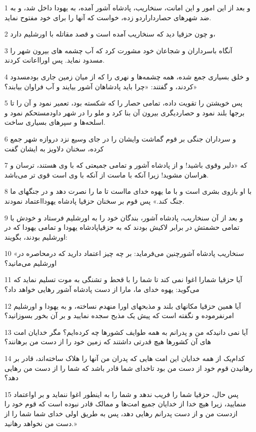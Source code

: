 \par 1 و بعد از این امور و این امانت، سنخاریب، پادشاه آشور آمده، به یهودا داخل شد، و به ضد شهرهای حصارداراردو زده، خواست که آنها را برای خود مفتوح نماید.
\par 2 و چون حزقیا دید که سنخاریب آمده است و قصد مقاتله با اورشلیم دارد،
\par 3 آنگاه باسرداران و شجاعان خود مشورت کرد که آب چشمه های بیرون شهر را مسدود نماید. پس اورااعانت کردند.
\par 4 و خلق بسیاری جمع شده، همه چشمه‌ها و نهری را که از میان زمین جاری بودمسدود کردند، و گفتند: «چرا باید پادشاهان آشور بیایند و آب فراوان بیابند؟»
\par 5 پس خویشتن را تقویت داده، تمامی حصار را که شکسته بود، تعمیر نمود و آن را تا برجها بلند نمود و حصاردیگری بیرون آن بنا کرد و ملو را در شهر داودمستحکم نمود و اسلحه‌ها و سپرهای بسیاری ساخت.
\par 6 و سرداران جنگی بر قوم گماشت وایشان را در جای وسیع نزد دروازه شهر جمع کرده، سخنان دلاویز به ایشان گفت
\par 7 که «دلیر وقوی باشید! و از پادشاه آشور و تمامی جمیعتی که با وی هستند، ترسان و هراسان مشوید! زیرا آنکه با ماست از آنکه با وی است قوی تر می‌باشد.
\par 8 با او بازوی بشری است و با ما یهوه خدای مااست تا ما را نصرت دهد و در جنگهای ما جنگ کند.» پس قوم بر سخنان حزقیا پادشاه یهودااعتماد نمودند.
\par 9 و بعد از آن سنخاریب، پادشاه آشور، بندگان خود را به اورشلیم فرستاد و خودش با تمامی حشمتش در برابر لاکیش بودند که به حزقیاپادشاه یهودا و تمامی یهودا که در اورشلیم بودند، بگویند:
\par 10 «سنخاریب پادشاه آشورچنین می‌فرماید: بر چه چیز اعتماد دارید که درمحاصره در اورشلیم می‌مانید؟
\par 11 آیا حزقیا شمارا اغوا نمی کند تا شما را با قحط و تشنگی به موت تسلیم نماید که می‌گوید: یهوه خدای ما، مارا از دست پادشاه آشور رهایی خواهد داد؟
\par 12 آیا همین حزقیا مکانهای بلند و مذبحهای اورا منهدم نساخته، و به یهودا و اورشلیم امرنفرموده و نگفته است که پیش یک مذبح سجده نمایید و بر آن بخور بسوزانید؟
\par 13 آیا نمی دانیدکه من و پدرانم به همه طوایف کشورها چه کرده‌ایم؟ مگر خدایان امت های آن کشورها هیچ قدرتی داشتند که زمین خود را از دست من برهانند؟
\par 14 کدام‌یک از همه خدایان این امت هایی که پدران من آنها را هلاک ساخته‌اند، قادر بر رهانیدن قوم خود از دست من بود تاخدای شما قادر باشد که شما را از دست من رهایی دهد؟
\par 15 پس حال، حزقیا شما را فریب ندهد و شما را به اینطور اغوا ننماید و بر اواعتماد منمایید، زیرا هیچ خدا از خدایان جمیع امت‌ها و ممالک قادر نبوده است که قوم خود را ازدست من و از دست پدرانم رهایی دهد، پس به طریق اولی خدای شما شما را از دست من نخواهد رهانید.»
